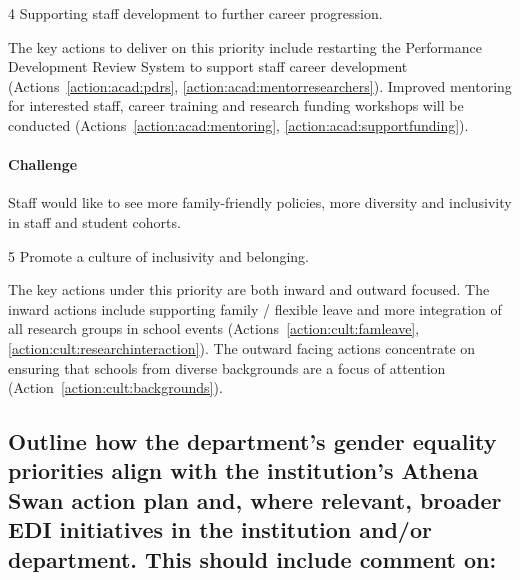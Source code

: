 \begin{priority}{4}
Supporting staff development to further career progression.
\hfill{
    \hypersetup{hidelinks}
    \hyperlink{p4}{\gotoactionsymbol{}}
}
\end{priority}


  
The key actions to deliver on this priority include restarting the Performance Development Review System to support staff career development (Actions~\ref{action:acad:pdrs}, \ref{action:acad:mentorresearchers}). Improved mentoring for interested staff, career training and research funding workshops will be conducted (Actions~\ref{action:acad:mentoring}, \ref{action:acad:supportfunding}).  

\paragraph{Challenge}
Staff would like to see more family-friendly policies, more diversity and inclusivity in staff and student cohorts.

\begin{priority}{5}
Promote a culture of inclusivity and belonging.
\hfill{
    \hypersetup{hidelinks}
    \hyperlink{p5}{\gotoactionsymbol{}}
}
\end{priority}

The key actions under this priority are both inward and outward focused.  The inward actions include supporting family / flexible leave and more integration of all research groups in school events (Actions~\ref{action:cult:famleave}, \ref{action:cult:researchinteraction}).  The outward facing actions concentrate on ensuring that schools from diverse backgrounds are a focus of attention (Action~\ref{action:cult:backgrounds}).




\subsection{Outline how the department’s gender equality priorities align with the institution’s Athena Swan action plan and, where relevant, broader EDI initiatives in the institution and/or department. This should include comment on:}


